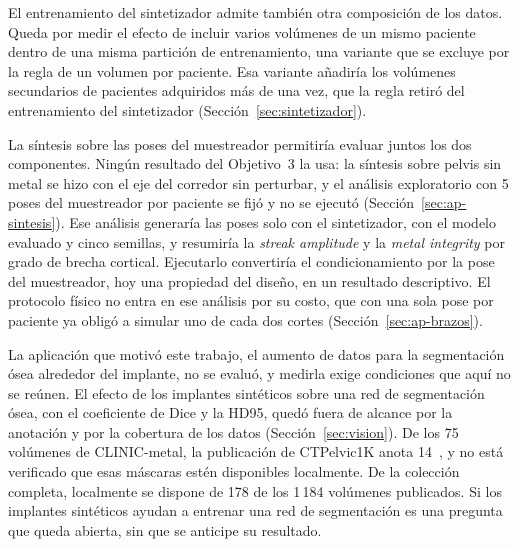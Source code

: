 El entrenamiento del sintetizador admite también otra composición de los datos. Queda por medir el efecto de incluir varios volúmenes de un mismo paciente dentro de una misma partición de entrenamiento, una variante que se excluye por la regla de un volumen por paciente. Esa variante añadiría los volúmenes secundarios de pacientes adquiridos más de una vez, que la regla retiró del entrenamiento del sintetizador (Sección~\ref{sec:sintetizador}).  

La síntesis sobre las poses del muestreador permitiría evaluar juntos los dos componentes. Ningún resultado del Objetivo~3 la usa: la síntesis sobre pelvis sin metal se hizo con el eje del corredor sin perturbar, y el análisis exploratorio con 5 poses del muestreador por paciente se fijó y no se ejecutó (Sección~\ref{sec:ap-sintesis}). Ese análisis generaría las poses solo con el sintetizador, con el modelo evaluado y cinco semillas, y resumiría la \emph{streak amplitude} y la \emph{metal integrity} por grado de brecha cortical. Ejecutarlo convertiría el condicionamiento por la pose del muestreador, hoy una propiedad del diseño, en un resultado descriptivo. El protocolo físico no entra en ese análisis por su costo, que con una sola pose por paciente ya obligó a simular uno de cada dos cortes (Sección~\ref{sec:ap-brazos}).


La aplicación que motivó este trabajo, el aumento de datos para la segmentación ósea alrededor del implante, no se evaluó, y medirla exige condiciones que aquí no se reúnen. El efecto de los implantes sintéticos sobre una red de segmentación ósea, con el coeficiente de Dice y la HD95, quedó fuera de alcance por la anotación y por la cobertura de los datos (Sección~\ref{sec:vision}). De los 75 volúmenes de CLINIC-metal, la publicación de CTPelvic1K anota 14~\cite{liu2021ctpelvic1k}, y no está verificado que esas máscaras estén disponibles localmente. De la colección completa, localmente se dispone de 178 de los 1\,184 volúmenes publicados.   Si los implantes sintéticos ayudan a entrenar una red de segmentación es una pregunta que queda abierta, sin que se anticipe su resultado.
